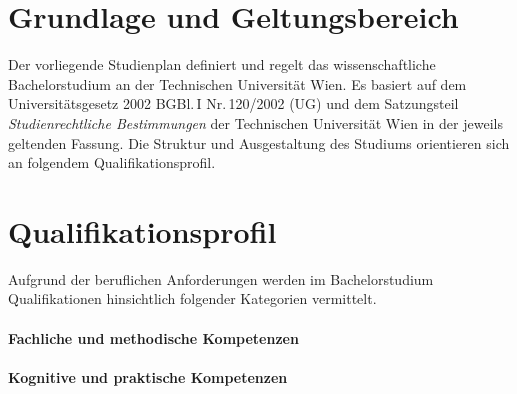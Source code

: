 
\newcommand*\Markierung{Bachelor}
\newcommand*\Studienart{Bachelorstudium}
\newcommand*\ArtikelAkkusativStudienart{das}
\DECKBLATT

\tableofcontents
\clearpage

\section{Grundlage und Geltungsbereich}\label{sec:GG}

Der vorliegende Studienplan definiert und regelt das
{}wissenschaftliche Bachelorstudium \emph{} an
der Technischen Universität Wien. Es basiert auf dem
Universitätsgesetz 2002 BGBl.\,I Nr.\,120/2002 (UG) und dem
Satzungsteil \emph{Studienrechtliche Bestimmungen} der Technischen
Universität Wien in der jeweils geltenden Fassung. Die Struktur und
Ausgestaltung des Studiums orientieren sich an folgendem
Qualifikationsprofil.

\section{Qualifikationsprofil}\label{sec:QP}

\newcommand*\QPIntro{%
  Das Bachelorstudium \emph{\VAR{Titel}} vermittelt eine breite,
  wissenschaftlich und methodisch hochwertige, auf dauerhaftes Wissen
  ausgerichtete Grund\-ausbildung, welche die Absolvent\_innen 
  sowohl für eine Weiterqualifizierung im Rahmen eines
  facheinschlägigen Masterstudiums als auch für eine Beschäftigung in
  beispielsweise folgenden Tätigkeitsbereichen befähigt und
  international konkurrenzfähig macht:%
}%

%

%

Aufgrund der beruflichen Anforderungen werden im Bachelorstudium
\emph{} Qualifikationen hinsichtlich folgender Kategorien
vermittelt.

\paragraph{Fachliche und methodische Kompetenzen}
%

\paragraph{Kognitive und praktische Kompetenzen}
%

